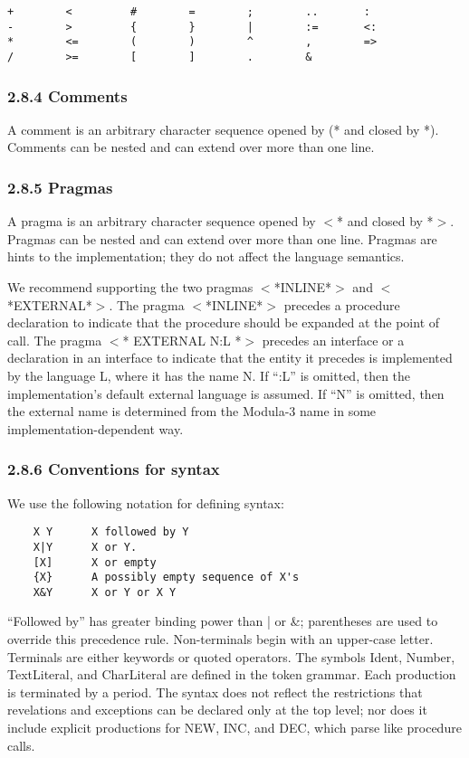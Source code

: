 \documentclass[10pt]{article}
\begin{document}
\begin{verbatim}
+        <         #        =        ;        ..       :
-        >         {        }        |        :=       <:
*        <=        (        )        ^        ,        =>
/        >=        [        ]        .        &
\end{verbatim}

\subsubsection*{2.8.4 Comments}

A comment is an arbitrary character sequence opened by (* and closed by
*).  Comments can be nested and can extend over more than one line.

\subsubsection*{2.8.5 Pragmas}

A pragma is an arbitrary character sequence opened by $<$* and closed by
*$>$.  Pragmas can be nested and can extend over more than one line.  Pragmas
are hints to the implementation; they do not affect the language semantics.

We recommend supporting the two pragmas $<$*INLINE*$>$ and $<$*EXTERNAL*$>$.
The pragma $<$*INLINE*$>$ precedes a procedure declaration to indicate that
the procedure should be expanded at the point of call.  The pragma $<$*
EXTERNAL N:L *$>$ precedes an interface or a declaration in an interface to
indicate that the entity it precedes is implemented by the language L, where
it has the name N.  If ``:L'' is omitted, then the implementation's default
external language is assumed.  If ``N'' is omitted, then the external name is
determined from the Modula-3 name in some implementation-dependent way.

\subsubsection*{2.8.6 Conventions for syntax}

We use the following notation for defining syntax:
\begin{verbatim}
    X Y      X followed by Y
    X|Y      X or Y.
    [X]      X or empty
    {X}      A possibly empty sequence of X's
    X&Y      X or Y or X Y
\end{verbatim}
``Followed by'' has greater binding power than | or \&; parentheses are used
to override this precedence rule.  Non-terminals begin with an upper-case
letter.  Terminals are either keywords or quoted operators.  The symbols Ident,
Number, TextLiteral, and CharLiteral are defined in the token grammar.  Each
production is terminated by a period.  The syntax does not reflect the
restrictions that revelations and exceptions can be declared only at the top
level; nor does it include explicit productions for NEW, INC, and DEC, which
parse like procedure calls.
\end{document}
